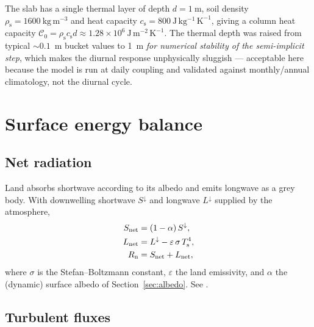 \begin{remark}
The slab has a single thermal layer of depth $d=1\ \mathrm{m}$, soil density
$\rho_{\mathrm s}=1600\ \mathrm{kg\,m^{-3}}$ and heat capacity
$c_{\mathrm s}=800\ \mathrm{J\,kg^{-1}\,K^{-1}}$, giving a column heat capacity
$\mathcal{C}_0 = \rho_{\mathrm s} c_{\mathrm s} d \approx
1.28\times10^{6}\ \mathrm{J\,m^{-2}\,K^{-1}}$. The thermal depth was raised from
typical $\sim\!0.1$~m bucket values to 1~m \emph{for numerical stability of the
semi-implicit step}, which makes the diurnal response unphysically sluggish ---
acceptable here because the model is run at daily coupling and validated against
monthly/annual climatology, not the diurnal cycle.
\end{remark}

\section{Surface energy balance}

\subsection{Net radiation}

Land absorbs shortwave according to its albedo and emits longwave as a grey
body. With downwelling shortwave $S^\downarrow$ and longwave $L^\downarrow$
supplied by the atmosphere,
\begin{align}
  S_{\mathrm{net}} &= (1-\alpha)\,S^\downarrow, \label{eq:swnet}\\
  L_{\mathrm{net}} &= L^\downarrow - \varepsilon\,\sigma\,T_{\mathrm s}^4,
  \label{eq:lwnet}\\
  R_{\mathrm n} &= S_{\mathrm{net}} + L_{\mathrm{net}},
\end{align}
where $\sigma$ is the Stefan--Boltzmann constant, $\varepsilon$ the land
emissivity, and $\alpha$ the (dynamic) surface albedo of
Section~\ref{sec:albedo}. See
.

\subsection{Turbulent fluxes}


